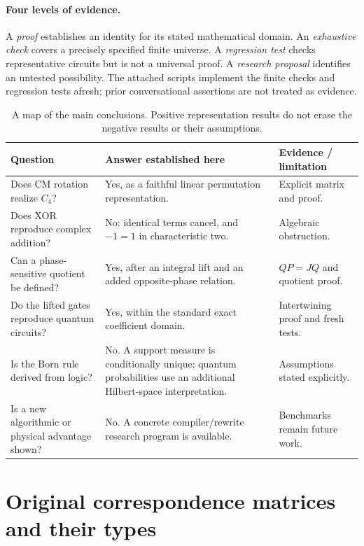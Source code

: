 \paragraph{Four levels of evidence.}
A \emph{proof} establishes an identity for its stated mathematical domain. An \emph{exhaustive check} covers a precisely specified finite universe. A \emph{regression test} checks representative circuits but is not a universal proof. A \emph{research proposal} identifies an untested possibility. The attached scripts implement the finite checks and regression tests afresh; prior conversational assertions are not treated as evidence.

\begin{table}[htbp]
\centering\small
\begin{tabularx}{\textwidth}{@{}L{0.25\textwidth}Y L{0.23\textwidth}@{}}
\toprule
Question & Answer established here & Evidence / limitation\\
\midrule
Does CM rotation realize $C_4$? & Yes, as a faithful linear permutation representation. & Explicit matrix and proof.\\
Does XOR reproduce complex addition? & No: identical terms cancel, and $-1=1$ in characteristic two. & Algebraic obstruction.\\
Can a phase-sensitive quotient be defined? & Yes, after an integral lift and an added opposite-phase relation. & $QP=JQ$ and quotient proof.\\
Do the lifted gates reproduce quantum circuits? & Yes, within the standard exact coefficient domain. & Intertwining proof and fresh tests.\\
Is the Born rule derived from logic? & No. A support measure is conditionally unique; quantum probabilities use an additional Hilbert-space interpretation. & Assumptions stated explicitly.\\
Is a new algorithmic or physical advantage shown? & No. A concrete compiler/rewrite research program is available. & Benchmarks remain future work.\\
\bottomrule
\end{tabularx}
\caption{A map of the main conclusions. Positive representation results do not erase the negative results or their assumptions.}
\end{table}

\section{Original correspondence matrices and their types}\label{sec:foundations}
